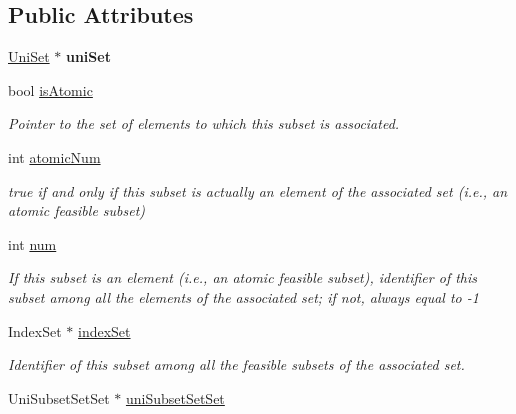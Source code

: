 \subsection*{Public Attributes}
\begin{DoxyCompactItemize}
\item 
\hypertarget{classUniSubset_a8e80f41fd95fe897ff04c813395c85d4}{\hyperlink{classUniSet}{Uni\-Set} $\ast$ {\bfseries uni\-Set}}\label{classUniSubset_a8e80f41fd95fe897ff04c813395c85d4}

\item 
\hypertarget{classUniSubset_a33f088ffb21e664508cfbfb75341513a}{bool \hyperlink{classUniSubset_a33f088ffb21e664508cfbfb75341513a}{is\-Atomic}}\label{classUniSubset_a33f088ffb21e664508cfbfb75341513a}

\begin{DoxyCompactList}\small\item\em Pointer to the set of elements to which this subset is associated. \end{DoxyCompactList}\item 
\hypertarget{classUniSubset_af111f69a265de0069e5705ce2c222f45}{int \hyperlink{classUniSubset_af111f69a265de0069e5705ce2c222f45}{atomic\-Num}}\label{classUniSubset_af111f69a265de0069e5705ce2c222f45}

\begin{DoxyCompactList}\small\item\em {\ttfamily true} if and only if this subset is actually an element of the associated set (i.\-e., an atomic feasible subset) \end{DoxyCompactList}\item 
\hypertarget{classUniSubset_a0b5a528a9edcc11061baff6ca4ce2657}{int \hyperlink{classUniSubset_a0b5a528a9edcc11061baff6ca4ce2657}{num}}\label{classUniSubset_a0b5a528a9edcc11061baff6ca4ce2657}

\begin{DoxyCompactList}\small\item\em If this subset is an element (i.\-e., an atomic feasible subset), identifier of this subset among all the elements of the associated set; if not, always equal to {\ttfamily -\/1} \end{DoxyCompactList}\item 
\hypertarget{classUniSubset_a32f7ed1b58639b5184c7c0321b08e6a1}{Index\-Set $\ast$ \hyperlink{classUniSubset_a32f7ed1b58639b5184c7c0321b08e6a1}{index\-Set}}\label{classUniSubset_a32f7ed1b58639b5184c7c0321b08e6a1}

\begin{DoxyCompactList}\small\item\em Identifier of this subset among all the feasible subsets of the associated set. \end{DoxyCompactList}\item 
\hypertarget{classUniSubset_a00491b5c614c9f1a548bec0a9e8aad4f}{Uni\-Subset\-Set\-Set $\ast$ \hyperlink{classUniSubset_a00491b5c614c9f1a548bec0a9e8aad4f}{uni\-Subset\-Set\-Set}}\label{classUniSubset_a00491b5c614c9f1a548bec0a9e8aad4f}


\end{DoxyCompactItemize}
